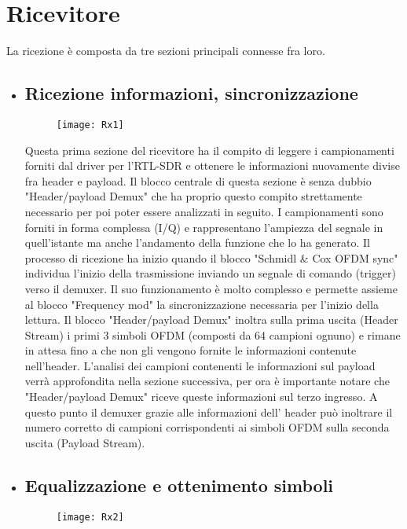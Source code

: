  \section{Ricevitore}
 La ricezione è composta da tre sezioni principali connesse fra loro.
 \begin{itemize}
 	\item \subsection{Ricezione informazioni, sincronizzazione}
 	\begin{figure}[h]
 		\centering
 		\texttt{[image: Rx1]}
 		\caption{}
 	\end{figure}
 Questa prima sezione del ricevitore ha il compito di leggere i campionamenti forniti dal driver per l'RTL-SDR e ottenere le informazioni nuovamente divise fra header e payload. Il blocco centrale di questa sezione è senza dubbio "Header/payload Demux" che ha proprio questo compito strettamente necessario per poi poter essere analizzati in seguito. I campionamenti sono forniti in forma complessa (I/Q) e rappresentano l'ampiezza del segnale in quell'istante ma anche l'andamento della funzione che lo ha generato. Il processo di ricezione ha inizio quando il blocco "Schmidl \& Cox OFDM sync" individua l'inizio della trasmissione inviando un segnale di comando (trigger) verso il demuxer. Il suo funzionamento è molto complesso e permette assieme al blocco "Frequency mod" la sincronizzazione necessaria per l'inizio della lettura. Il blocco "Header/payload Demux" inoltra sulla prima uscita (Header Stream) i primi 3 simboli OFDM (composti da 64 campioni ognuno) e rimane in attesa fino a che non gli vengono fornite le informazioni contenute nell'header. L'analisi dei campioni contenenti le informazioni sul payload verrà approfondita nella sezione successiva, per ora è importante notare che "Header/payload Demux" riceve queste informazioni sul terzo ingresso. A questo punto il demuxer grazie alle informazioni dell' header può inoltrare il numero corretto di campioni corrispondenti ai simboli OFDM sulla seconda uscita (Payload Stream).
 	\item \subsection{Equalizzazione e ottenimento simboli}
 	\begin{figure}[h]
 		\raggedleft
 		\texttt{[image: Rx2]}
 		\caption{}
 	\end{figure}

\end{itemize}
